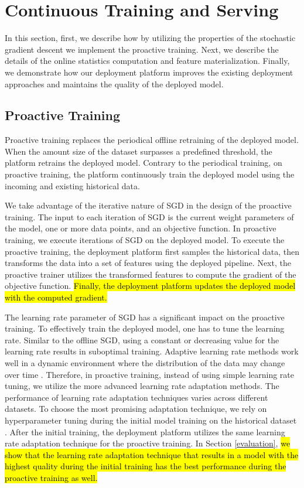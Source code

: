 \section{Continuous Training and Serving} \label{continuous-training-serving}
In this section, first, we describe how by utilizing the properties of the stochastic gradient descent we implement the proactive training.
Next, we describe the details of the online statistics computation and feature materialization.
Finally, we demonstrate how our deployment platform improves the existing deployment approaches and maintains the quality of the deployed model.

\subsection{Proactive Training} \label{proactive-training}
Proactive training replaces the periodical offline retraining of the deployed model.
When the amount size of the dataset surpasses a predefined threshold, the platform retrains the deployed model.
Contrary to the periodical training, on proactive training, the platform continuously train the deployed model using the incoming and existing historical data.

We take advantage of the iterative nature of SGD in the design of the proactive training.
The input to each iteration of SGD is the current weight parameters of the model, one or more data points, and an objective function.
In proactive training, we execute iterations of SGD on the deployed model.
To execute the proactive training, the deployment platform first samples the historical data, then transforms the data into a set of features using the deployed pipeline.
Next, the proactive trainer utilizes the transformed features to compute the gradient of the objective function.
\hl{Finally, the deployment platform updates the deployed model with the computed gradient.}

The learning rate parameter of SGD has a significant impact on the proactive training.
To effectively train the deployed model, one has to tune the learning rate.
Similar to the offline SGD, using a constant or decreasing value for the learning rate results in suboptimal training.
Adaptive learning rate methods work well in a dynamic environment where the distribution of the data may change over time \cite{zeiler2012adadelta}.
Therefore, in proactive training, instead of using simple learning rate tuning, we utilize the more advanced learning rate adaptation methods.
The performance of learning rate adaptation techniques varies across different datasets.
To choose the most promising adaptation technique, we rely on hyperparameter tuning during the initial model training on the historical dataset \cite{bergstra2012random}.
After the initial training, the deployment platform utilizes the same learning rate adaptation technique for the proactive training.
In Section \ref{evaluation}, \hl{we show that the learning rate adaptation technique that results in a model with the highest quality during the initial training has the best performance during the proactive training as well.}

